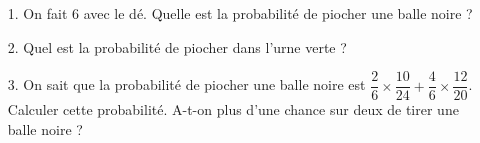   \begin{enumerate}
    \item[1.] On fait 6 avec le dé. Quelle est la probabilité de piocher une balle noire ? \\ \Pointilles[3] 
    \item[2.] Quel est la probabilité de piocher dans l'urne verte ? \\ \Pointilles[3] 
    \item[3.] On sait que la probabilité de piocher une balle noire est $\dfrac{2}{6} \times \dfrac{10}{24} + \dfrac{4}{6} \times \dfrac{12}{20}$. \\
    Calculer cette probabilité. A-t-on plus d'une chance sur deux de tirer une balle noire ? \\ \Pointilles[3] 
  \end{enumerate}
  


